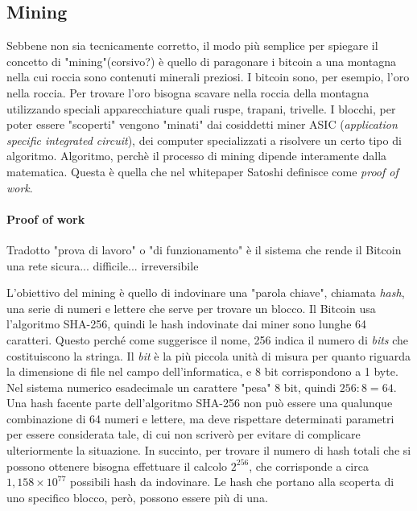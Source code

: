 \documentclass {article}
\begin{document}
\subsection {Mining}


Sebbene non sia tecnicamente corretto, il modo più semplice per spiegare il concetto di "mining"(corsivo?) è quello di paragonare i bitcoin a una montagna nella cui roccia sono contenuti minerali preziosi.
I bitcoin sono, per esempio, l'oro nella roccia.
Per trovare l'oro bisogna scavare nella roccia della montagna utilizzando speciali apparecchiature quali ruspe, trapani, trivelle.
I blocchi, per poter essere "scoperti" vengono "minati" dai cosiddetti miner ASIC (\textit{application specific integrated circuit}), dei computer specializzati a risolvere un certo tipo di algoritmo.
Algoritmo, perchè il processo di mining dipende interamente dalla matematica.
Questa è quella che nel whitepaper Satoshi definisce come \textit{proof of work}.


\paragraph {Proof of work}


Tradotto "prova di lavoro" o "di funzionamento" è il sistema che rende il Bitcoin una rete sicura... difficile... irreversibile

L'obiettivo del mining è quello di indovinare una "parola chiave", chiamata \textit{hash}, una serie di numeri e lettere che serve per trovare un blocco.
Il Bitcoin usa l'algoritmo SHA-256, quindi le hash indovinate dai miner sono lunghe 64 caratteri.
Questo perché come suggerisce il nome, 256 indica il numero di \textit{bits} che costituiscono la stringa.
Il \textit{bit} è la più piccola unità di misura per quanto riguarda la dimensione di file nel campo dell'informatica, e 8 bit corrispondono a 1 byte.
Nel sistema numerico esadecimale un carattere "pesa" 8 bit, quindi $256 : 8 = 64$.
Una hash facente parte dell'algoritmo SHA-256 non può essere una qualunque combinazione di 64 numeri e lettere, ma deve rispettare determinati parametri per essere considerata tale, di cui non scriverò per evitare di complicare ulteriormente la situazione.
In succinto, per trovare il numero di hash totali che si possono ottenere bisogna effettuare il  calcolo $2^{256}$, che corrisponde a circa $1,158 \times 10^{77}$ possibili hash da indovinare.
Le hash che portano alla scoperta di uno specifico blocco, però, possono essere più di una.
\end{document}
